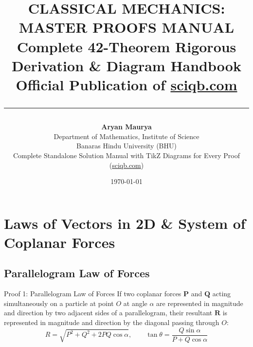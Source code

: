 \documentclass[11pt, a4paper]{report}
\title{
    \vspace{-1.5cm}
    {\Huge\bfseries\color{primaryblue} CLASSICAL MECHANICS: MASTER PROOFS MANUAL}\\[0.4cm]
    {\Large\color{secondaryblue} Complete 42-Theorem Rigorous Derivation \& Diagram Handbook}\\[0.3cm]
    {\large\color{accentred}\bfseries Official Publication of \href{https://sciqb.com}{sciqb.com}}\\[0.5cm]
    \rule{0.8\textwidth}{1.5pt}
}
\author{
    \textbf{Aryan Maurya} \\
    Department of Mathematics, Institute of Science \\
    Banaras Hindu University (BHU) \\[1em]
    \small Complete Standalone Solution Manual with TikZ Diagrams for Every Proof (\href{https://sciqb.com}{sciqb.com})
}
\date{\today}
\begin{document}
\maketitle

\tableofcontents
\newpage

\chapter{Laws of Vectors in 2D \& System of Coplanar Forces}

\section{Parallelogram Law of Forces}

\begin{theorembox}{Proof 1: Parallelogram Law of Forces}
If two coplanar forces $\mathbf{P}$ and $\mathbf{Q}$ acting simultaneously on a particle at point $O$ at angle $\alpha$ are represented in magnitude and direction by two adjacent sides of a parallelogram, their resultant $\mathbf{R}$ is represented in magnitude and direction by the diagonal passing through $O$:
\begin{equation}
R = \sqrt{P^2 + Q^2 + 2PQ\cos\alpha}, \qquad \tan\theta = \frac{Q\sin\alpha}{P + Q\cos\alpha}
\end{equation}
\end{theorembox}
\end{document}
